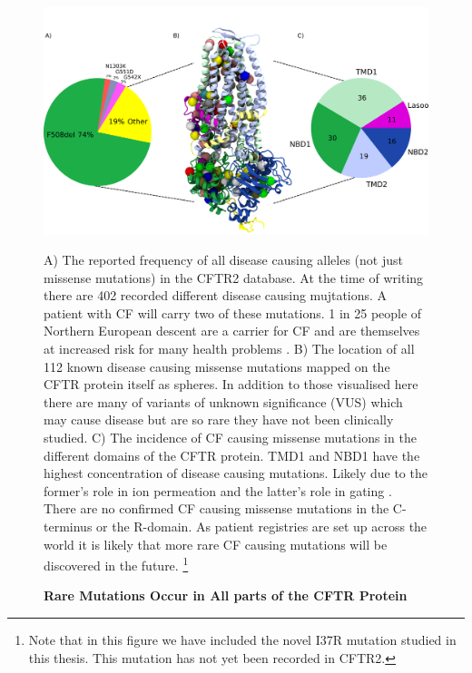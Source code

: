 \begin{figure}
	\begin{center}
	\includegraphics[width=\textwidth]{figures/alleles_pie_chart.pdf}
	\end{center}
	\label{CFTR_structure_domains}
	\captionsetup{singlelinecheck = false, justification=raggedright}
	\caption[Rare Mutations Occur in Across the CFTR Protein] {\textbf{Rare Mutations Occur in All parts of the CFTR Protein}}{A) The reported frequency of all disease causing alleles (not just missense mutations) in the CFTR2 database. At the time of writing there are 402 recorded different disease causing mujtations. A patient with CF will carry two of these mutations. 1 in 25 people of Northern European descent are a carrier for CF and are themselves at increased risk for many health problems \cite{ioannou2014, miller2020}. B) The location of all 112 known disease causing missense mutations mapped on the CFTR protein itself as spheres. In addition to those visualised here there are many of variants of unknown significance (VUS) which may cause disease but are so rare they have not been clinically studied. C) The incidence of CF causing missense mutations in the different domains of the CFTR protein. TMD1 and NBD1 have the highest concentration of disease causing mutations. Likely due to the former's role in ion permeation and the latter's role in gating \cite{cftr2}}. There are no confirmed CF causing missense mutations in the C-terminus or the R-domain. As patient registries are set up across the world it is likely that more rare CF causing mutations will be discovered in the future. \footnote{Note that in this figure we have included the novel I37R mutation studied in this thesis. This mutation has not yet been recorded in CFTR2.} 
\end{figure}


